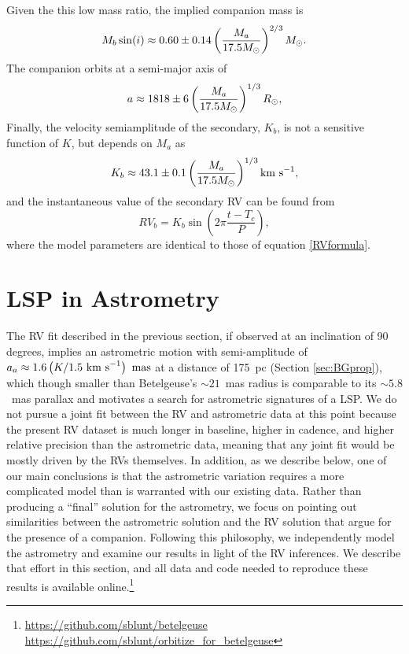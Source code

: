 \documentclass[twocolumn]{aastex631}
\begin{document}
Given the this low mass ratio, the implied companion mass is
\begin{equation}
M_b \sin(i) \approx 0.60 \pm 0.14  \left(M_a \over 17.5 M_\odot\right)^{2/3} M_\odot.
\end{equation} 
The companion orbits at a semi-major axis of 
\begin{equation}
a \approx 1818 \pm 6 \left(M_a \over 17.5 M_\odot \right)^{1/3} R_\odot,
\end{equation}
Finally, the velocity semiamplitude of the secondary, $K_b$, is not a sensitive function of $K$, but depends on $M_a$ as
\begin{equation}
    K_b \approx 43.1\pm 0.1  \left(M_a \over 17.5 M_\odot\right)^{1/3} {\rm km~s}^{-1},
\end{equation}
and the instantaneous value of the secondary RV can be found from 
\begin{equation}
    RV_b =   K_b \sin \left( 2\pi \frac{t-T_c }{P}  \right),
\end{equation}
where the model parameters are identical to those of equation \eqref{RVformula}. 



\section{LSP in Astrometry}
\label{sec:astrometry}

The RV fit described in the previous section, if observed at an inclination of 90 degrees, implies an astrometric motion with semi-amplitude of  $a_a \approx 1.6 \left( K / 1.5{\rm ~km~s}^{-1} \right)~{\rm mas} $
at a distance of 175~pc (Section \ref{sec:BGprop}), which though smaller than Betelgeuse's $\sim 21$~mas radius is comparable to its $\sim 5.8$~mas parallax and motivates a search for astrometric signatures of a LSP.  We do not pursue a joint fit between the RV and astrometric data at this point because the present RV dataset is much longer in baseline, higher in cadence, and higher relative precision than the astrometric data, meaning that any joint fit would be mostly driven by the RVs themselves. In addition, as we describe below, one of our main conclusions is that the astrometric variation requires a more complicated model than is warranted with our existing data. Rather than producing a ``final'' solution for the astrometry, we focus on pointing out similarities between the astrometric solution and the RV solution that argue for the presence of a companion. Following this philosophy, we independently model the astrometry and examine our results in light of the RV inferences. We describe that effort in this section, and all data and code needed to reproduce these results is available online.\footnote{ \url{https://github.com/sblunt/betelgeuse} \url{https://github.com/sblunt/orbitize_for_betelgeuse}} 
\end{document}

